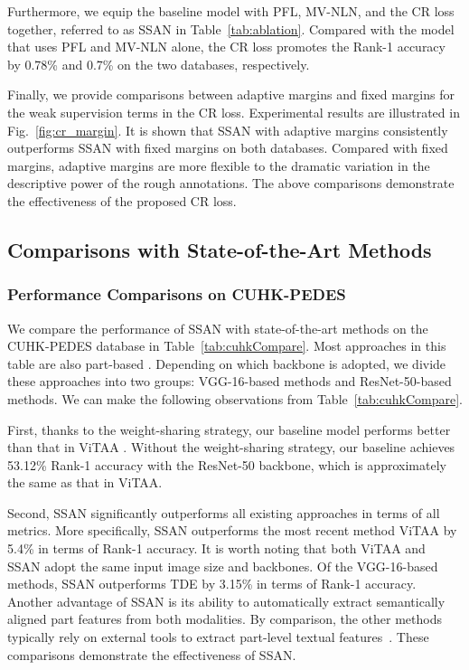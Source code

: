 \documentclass[journal]{IEEEtran}
\begin{document}
Furthermore, we equip the baseline model with PFL, MV-NLN, and the CR loss together, referred to as SSAN in Table~\ref{tab:ablation}. Compared with the model that uses PFL and MV-NLN alone, the CR loss promotes the Rank-1 accuracy by 0.78\% and 0.7\% on the two databases, respectively.


Finally, we provide comparisons between adaptive margins and fixed margins for the weak supervision terms in the CR loss.
Experimental results are illustrated in Fig.~\ref{fig:cr_margin}.
It is shown that SSAN with adaptive margins consistently outperforms SSAN with fixed margins on both databases.
Compared with fixed margins, adaptive margins are more flexible to the dramatic variation in the descriptive power of the rough annotations.
The above comparisons demonstrate the effectiveness of the proposed CR loss.


\subsection{Comparisons with State-of-the-Art Methods}

\subsubsection{Performance Comparisons on CUHK-PEDES}
We compare the performance of SSAN with state-of-the-art methods on the CUHK-PEDES database in Table~\ref{tab:cuhkCompare}.
Most approaches in this table are also part-based \cite{chen2018improving,jing2020pose,niu2020improving,wang2020vitaa}.
Depending on which backbone is adopted, we divide these approaches into two groups: VGG-16-based methods and ResNet-50-based methods.
We can make the following observations from Table~\ref{tab:cuhkCompare}.

First, thanks to the weight-sharing strategy, our baseline model performs better than that in ViTAA \cite{wang2020vitaa}. Without the weight-sharing strategy, our baseline achieves 53.12\% Rank-1 accuracy with the ResNet-50 backbone, which is approximately the same as that in ViTAA.

Second, SSAN significantly outperforms all existing approaches in terms of all metrics. More specifically, SSAN outperforms the most recent method ViTAA \cite{wang2020vitaa} by 5.4\% in terms of Rank-1 accuracy. It is worth noting that both ViTAA and SSAN adopt the same input image size and backbones. Of the VGG-16-based methods, SSAN outperforms TDE \cite{niu2020textual} by 3.15\% in terms of Rank-1 accuracy. Another advantage of SSAN is its ability to automatically extract semantically aligned part features from both modalities. By comparison, the other methods typically rely on external tools to extract part-level textual features~\cite{jing2020pose,niu2020improving,wang2020vitaa}. These comparisons demonstrate the effectiveness of SSAN.
\end{document}
